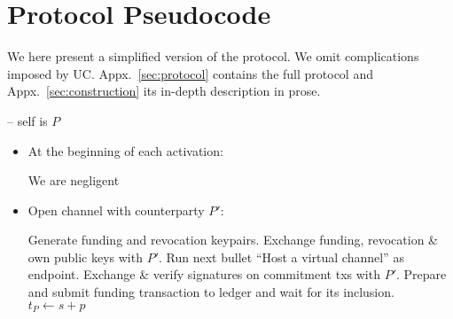 \section{Protocol Pseudocode}
\label{sec:pseudocode}

We here present a simplified version of the protocol. We omit
complications imposed by UC. Appx.~\ref{sec:protocol} contains
the full protocol and Appx.~\ref{sec:construction} its in-depth
description in prose.
\ \\

\begin{center}
  \begin{processbox}{\pchan -- self is $P$}
    \begin{itemize}
      \item At the beginning of each activation:
      \begin{algorithmic}[0]
          \State We are negligent 
        \EndIf
      \end{algorithmic}

      \item Open channel with counterparty $P'$:
      \begin{algorithmic}[0]
        \State Generate funding and revocation keypairs.
        \State Exchange funding, revocation \& own public keys with $P'$.
          \State Run next bullet ``Host a virtual channel'' as endpoint.
        \EndIf
        \State Exchange \& verify signatures on commitment txs with $P'$.
          \State Prepare and submit funding transaction to ledger and wait for
          its inclusion. 
          \State $t_P \gets s + p$ 
          \State {}
        \EndIf
      \end{algorithmic}


\end{itemize}
\end{processbox}
\end{center}
